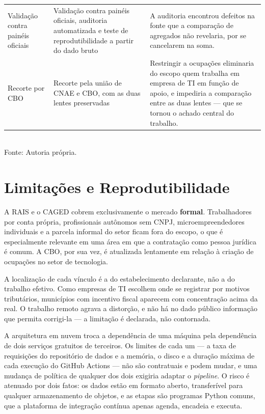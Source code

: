 \begin{quadro}[htbp]
\begin{tabularx}{\textwidth}{%
        >{\raggedright\arraybackslash\hsize=0.75\hsize}X
        >{\raggedright\arraybackslash\hsize=0.95\hsize}X
        >{\raggedright\arraybackslash\hsize=1.30\hsize}X}
        Validação contra painéis oficiais & Validação contra painéis oficiais, auditoria automatizada e teste de reprodutibilidade a partir do dado bruto & A auditoria encontrou defeitos na fonte que a comparação de agregados não revelaria, por se cancelarem na soma. \\
        Recorte por CBO & Recorte pela união de CNAE e CBO, com as duas lentes preservadas & Restringir a ocupações eliminaria do escopo quem trabalha em empresa de TI em função de apoio, e impediria a comparação entre as duas lentes --- que se tornou o achado central do trabalho. \\
        \bottomrule
    \end{tabularx}
    \\[4pt]
    Fonte: Autoria própria.
\end{quadro}

\section{Limitações e Reprodutibilidade}
\label{sec:limitacoes-metodo}

A RAIS e o CAGED cobrem exclusivamente o mercado \textbf{formal}. Trabalhadores por conta própria, profissionais autônomos sem CNPJ, microempreendedores individuais e a parcela informal do setor ficam fora do escopo, o que é especialmente relevante em uma área em que a contratação como pessoa jurídica é comum. A CBO, por sua vez, é atualizada lentamente em relação à criação de ocupações no setor de tecnologia.

A localização de cada vínculo é a do estabelecimento declarante, não a do trabalho efetivo. Como empresas de TI escolhem onde se registrar por motivos tributários, municípios com incentivo fiscal aparecem com concentração acima da real. O trabalho remoto agrava a distorção, e não há no dado público informação que permita corrigi-la --- a limitação é declarada, não contornada.

A arquitetura em nuvem troca a dependência de uma máquina pela dependência de dois serviços gratuitos de terceiros. Os limites de cada um --- a taxa de requisições do repositório de dados e a memória, o disco e a duração máxima de cada execução do GitHub Actions --- não são contratuais e podem mudar, e uma mudança de política de qualquer dos dois exigiria adaptar o \textit{pipeline}. O risco é atenuado por dois fatos: os dados estão em formato aberto, transferível para qualquer armazenamento de objetos, e as etapas são programas Python comuns, que a plataforma de integração contínua apenas agenda, encadeia e executa.

